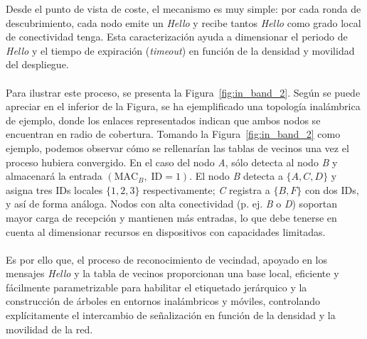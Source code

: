 Desde el punto de vista de coste, el mecanismo es muy simple: por cada ronda de descubrimiento, cada nodo emite un \textit{Hello} y recibe tantos \textit{Hello} como grado local de conectividad tenga. Esta caracterización ayuda a dimensionar el periodo de \textit{Hello} y el tiempo de expiración (\textit{timeout}) en función de la densidad y movilidad del despliegue.\\
\\
Para ilustrar este proceso, se presenta la Figura~\ref{fig:in_band_2}. Según se puede apreciar en el inferior de la Figura, se ha ejemplificado una topología inalámbrica de ejemplo, donde los enlaces representados indican que ambos nodos se encuentran en radio de cobertura. Tomando la Figura~\ref{fig:in_band_2} como ejemplo, podemos observar cómo se rellenarían las tablas de vecinos una vez el proceso hubiera convergido. En el caso del nodo \textit{A}, sólo detecta al nodo \textit{B} y almacenará la entrada \((\text{MAC}_B,\; \text{ID}=1)\). El nodo \textit{B} detecta a \(\{A,C,D\}\) y asigna tres IDs locales \(\{1,2,3\}\) respectivamente; \textit{C} registra a \(\{B,F\}\) con dos IDs, y así de forma análoga. Nodos con alta conectividad (p. ej. \textit{B} o \textit{D}) soportan mayor carga de recepción y mantienen más entradas, lo que debe tenerse en cuenta al dimensionar recursos en dispositivos con capacidades limitadas.\\
\\
Es por ello que, el proceso de reconocimiento de vecindad, apoyado en los mensajes \textit{Hello} y la tabla de vecinos proporcionan una base local, eficiente y fácilmente parametrizable para habilitar el etiquetado jerárquico y la construcción de árboles en entornos inalámbricos y móviles, controlando explícitamente el intercambio de señalización en función de la densidad y la movilidad de la red.


